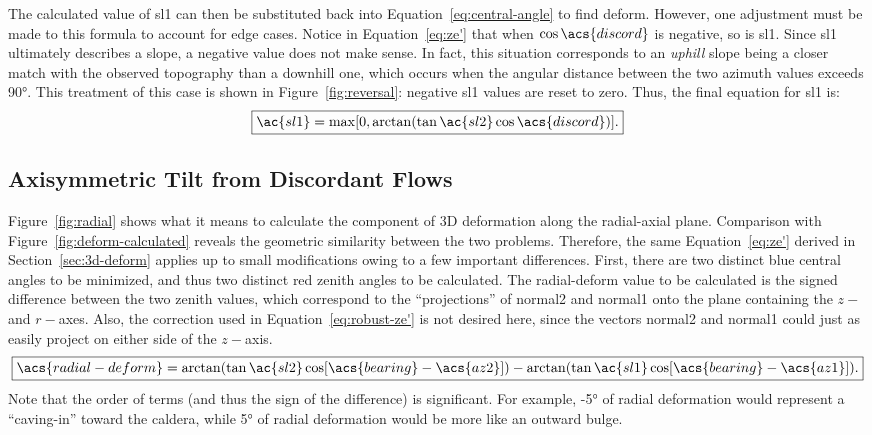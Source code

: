 The calculated value of \acs{sl1} can then be substituted back into Equation~\eqref{eq:central-angle} to find \acs{deform}. However, one adjustment must be made to this formula to account for edge cases. Notice in Equation~\eqref{eq:ze'} that when $\cos\acs{discord}$ is negative, so is \acs{sl1}. Since \acs{sl1} ultimately describes a slope, a negative value does not make sense. In fact, this situation corresponds to an \emph{uphill} slope being a closer match with the observed topography than a downhill one, which occurs when the angular distance between the two azimuth values exceeds \ang{90}. This treatment of this case is shown in Figure~\ref{fig:reversal}: negative \acs{sl1} values are reset to zero. Thus, the final equation for \acs{sl1} is:
\begin{equation}
    \boxed{\ac{sl1}
    =\max[0,\arctan(\tan\ac{sl2}
    \cos\acs{discord})].}
    \label{eq:robust-ze'}
\end{equation}

\subsection{Axisymmetric Tilt from Discordant Flows}

Figure~\ref{fig:radial} shows what it means to calculate the component of 3D deformation along the radial-axial plane. Comparison with Figure~\ref{fig:deform-calculated} reveals the geometric similarity between the two problems. Therefore, the same Equation~\ref{eq:ze'} derived in Section~\ref{sec:3d-deform} applies up to small modifications owing to a few important differences. First, there are two distinct blue central angles to be minimized, and thus two distinct red zenith angles to be calculated. The \acf{radial-deform} value to be calculated is the signed difference between the two zenith values, which correspond to the ``projections'' of \acs{normal2} and \acs{normal1} onto the plane containing the $z-$ and $r-$axes. Also, the correction used in Equation~\eqref{eq:robust-ze'} is not desired here, since the vectors \acs{normal2} and \acs{normal1} could just as easily project on either side of the $z-$axis.
\begin{equation}
    \boxed{\acs{radial-deform}
    =\arctan(\tan\ac{sl2}
    \cos[\acs{bearing}-\acs{az2}])
    -\arctan(\tan\ac{sl1}
    \cos[\acs{bearing}-\acs{az1}]).}\label{eq:tilt-from-mapping}
\end{equation}
Note that the order of terms (and thus the sign of the difference) is significant. For example, \ang{-5} of radial deformation would represent a ``caving-in'' toward the caldera, while \ang{+5} of radial deformation would be more like an outward bulge.


